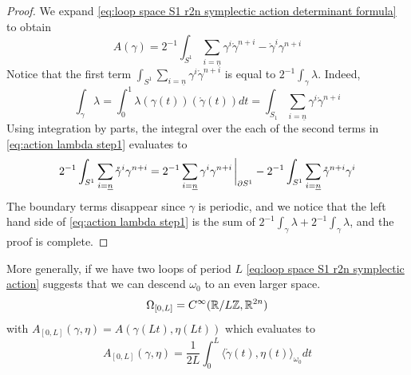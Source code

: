 \documentclass[../main-v2-manifolds.tex]{subfiles}
\begin{document}
\begin{proof}
    We expand \cref{eq:loop space S1 r2n symplectic action determinant formula} to obtain 
    \begin{equation}
        A(\gamma) = 2^{-1}\int_{S^1} \sum_{i =\underline{n}} \gamma^i\mathring{\gamma}^{n+i} - \mathring{\gamma}^{i}\gamma^{n+i} 
        \label{eq:action lambda step1}
    \end{equation}
    Notice that the first term $\int_{S^1} \sum_{i=\underline{n}} \gamma^i\mathring{\gamma}^{n+i}$ is equal to $2^{-1}\int_\gamma \lambda$. Indeed,
    \[
        \int_{\gamma}\lambda = \int_{0}^1 \lambda(\gamma(t))(\mathring{\gamma}(t)) dt = \int_{S_1} \sum_{i=\underline{n}}\gamma^i\mathring{\gamma}^{n+i}
    \]
    Using integration by parts, the integral over the each of the second terms in \cref{eq:action lambda step1} evaluates to
    \[
        2^{-1}\int_{S^1} \sum_{i=\underline{n}} \mathring{\gamma}^{i}\gamma^{n+i}=2^{-1}\sum_{i=\underline{n}}\gamma^{i}\gamma^{n+i}\eval_{\partial S^1} - 2^{-1}\int_{S^1}\sum_{i=\underline{n}}\mathring{\gamma}^{n+i}\gamma^{i}
    \]
    The boundary terms disappear since $\gamma$ is periodic, and we notice that the left hand side of \cref{eq:action lambda step1} is the sum of $2^{-1}\int_\gamma\lambda + 2^{-1}\int_{\gamma}\lambda$, and the proof is complete.
\end{proof}
%
%
%
\begin{remark}
    More generally, if we have two loops of period $L$ \cref{eq:loop space S1 r2n symplectic action} suggests that we can descend $\omega_0$ to an even larger space.
    \begin{equation}
        \Omega_{[0,L]} = C^\infty(\mathbb{R}/L\mathbb{Z}, {\mathbb{R}^{2n}})
        \label{eq:[0,L] r2n space}
    \end{equation}
    with $A_{[0,L]}(\gamma,\eta) = A(\gamma(Lt),\eta(Lt))$ which evaluates to
    \begin{equation}
     A_{[0,L]}(\gamma,\eta) = \frac{1}{2L}\int_{0}^{L}\langle \mathring{\gamma}(t),\eta(t)\rangle_{\omega_0}dt
     \label{eq:[0,L] r2n symplectic action}
    \end{equation}
\end{remark}
\end{document}
